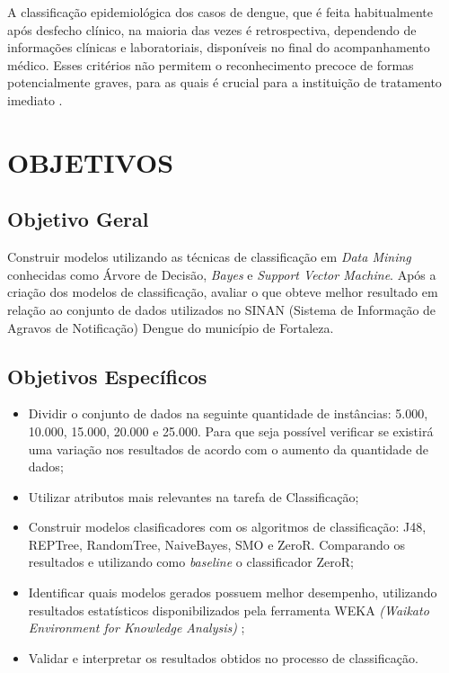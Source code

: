 \documentclass[
	12pt,				%
	openright,			%
	oneside,	
	a4paper,				%
	english,				%
	brazil				%
]{abntex2/abntex2} %
\begin{document}
		A classificação epidemiológica dos casos de dengue, que é feita habitualmente após desfecho clínico, na maioria das vezes é retrospectiva, dependendo de informações clínicas e laboratoriais, disponíveis no final do acompanhamento médico. Esses critérios não permitem o reconhecimento precoce de formas potencialmente graves, para as quais é crucial para a instituição de tratamento imediato \cite{saude:2013}.

	\section{OBJETIVOS}
	
		\subsection{Objetivo Geral}

		Construir modelos utilizando as técnicas de classificação em \textit{Data Mining} conhecidas como Árvore de Decisão, \textit{Bayes} e \textit{Support Vector Machine}. Após a criação dos modelos de classificação, avaliar o que obteve melhor resultado em relação ao conjunto de dados utilizados no SINAN (Sistema de Informação de Agravos de Notificação) Dengue do município de Fortaleza. 
		
		\subsection{Objetivos Específicos}
		
		\begin{itemize}
			\item Dividir o conjunto de dados na seguinte quantidade de instâncias: 5.000, 10.000, 15.000, 20.000 e 25.000. Para que seja possível verificar se existirá uma variação nos resultados de acordo com o aumento da quantidade de dados;
			
			\item Utilizar atributos mais relevantes na tarefa de Classificação;
			
			\item Construir modelos clasificadores com os algoritmos de classificação: J48, REPTree, RandomTree, NaiveBayes, SMO e ZeroR. Comparando os resultados e utilizando como \textit{baseline} o classificador ZeroR;

			\item Identificar quais modelos gerados possuem melhor desempenho, utilizando resultados estatísticos disponibilizados pela ferramenta WEKA \textit{(Waikato Environment for Knowledge Analysis)} ;
			
			\item Validar e interpretar os resultados obtidos no processo de classificação.
		\end{itemize}
		
\end{document}
